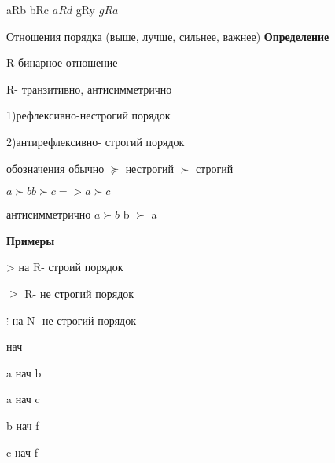 \documentclass{article}
\begin{document}
aRb bRc \sout{$aRd$} gRy \sout{$gRa$}

Отношения порядка
(выше, лучше, сильнее, важнее)
\textbf{Определение}

R-бинарное отношение

R- транзитивно, антисимметрично

1)рефлексивно-нестрогий порядок

2)антирефлексивно- строгий порядок

обозначения обычно $\succeq$ нестрогий $\succ$ строгий

$a \succ b b \succ c => a \succ c$

антисимметрично $a \succ b$
b $\succ$ a

\textbf{Примеры}

> на R- строий порядок

$\geq$ R- не строгий порядок

$\vdots$ на N- не строгий порядок

нач

a нач b

a нач c

b нач f

c нач f
\end{document}
